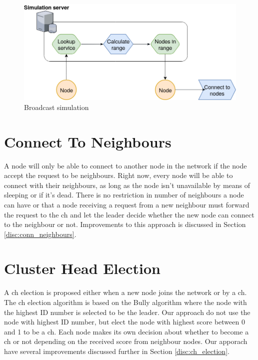 \documentclass[USenglish]{uit-thesis}
\begin{document}
\begin{figure} [!b]
\centering
\includegraphics[width=\textwidth]{broadcast_simulation.png}
\caption{Broadcast simulation}
\label{fig:broadcast_simulation}
\end{figure}

\section{Connect To Neighbours}
A node will only be able to connect to another node in the network if the node accept the request to be neighbours. Right now, every node will be able to connect with their neighbours, as long as the node isn't unavailable by means of sleeping or if it's dead. There is no restriction in number of neighbours a node can have or that a node receiving a request from a new neighbour must forward the request to the \gls{ch} and let the leader decide whether the new node can connect to the neighbour or not. Improvements to this approach is discussed in Section \ref{disc:conn_neighbours}.


\section{Cluster Head Election} \label{imp:ch_election}

A \gls{ch} election is proposed either when a new node joins the network or by a \gls{ch}. 
The \gls{ch} election algorithm is based on the Bully algorithm where the node with the highest ID number is selected to be the leader. Our approach do not use the node with highest ID number, but elect the node with highest score between 0 and 1 to be a \gls{ch}. Each node makes its own decision about whether to become a \gls{ch} or not depending on the received score from neighbour nodes.
Our apporach have several improvements discussed further in Section \ref{disc:ch_election}. 
\end{document}
